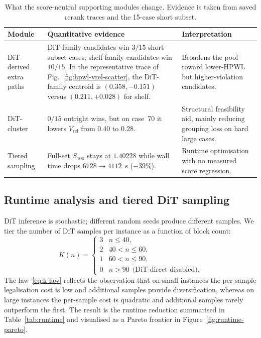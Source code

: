 \documentclass[nolineno]{ieeeaccess}
\begin{document}
\begin{table}[t]
\caption{What the score-neutral supporting modules change. Evidence is
taken from saved rerank traces and the 15-case short subset.}
\label{tab:supporting-effects}
\centering
\footnotesize
\begin{tabular}{@{}L{1.8cm}L{2.3cm}L{3.2cm}@{}}
\toprule
Module & Quantitative evidence & Interpretation\\
\midrule
DiT-derived extra paths & DiT-family candidates win $3/15$ short-subset cases; shelf-family candidates win $10/15$. In the representative trace of Fig.~\ref{fig:hpwl-vrel-scatter}, the DiT-family centroid is $(0.358,-0.151)$ versus $(0.211,+0.028)$ for shelf. & Broadens the pool toward lower-HPWL but higher-violation candidates.\\
DiT-cluster & $0/15$ outright wins, but on case~70 it lowers $V_{\text{rel}}$ from $0.40$ to $0.28$. & Structural feasibility aid, mainly reducing grouping loss on hard large cases.\\
Tiered sampling & Full-set $S_{100}$ stays at $1.40228$ while wall time drops $6728 \to 4112$~s ($-39\%$). & Runtime optimisation with no measured score regression.\\
\bottomrule
\end{tabular}
\end{table}

\subsection{Runtime analysis and tiered DiT sampling}
\label{sec:runtime-analysis}

DiT inference is stochastic; different random seeds produce different
samples. We tier the number of DiT samples per instance as a function
of block count:
\begin{equation}
K(n) = \begin{cases}
3 & n\le 40,\\
2 & 40 < n \le 60,\\
1 & 60 < n \le 90,\\
0 & n > 90 \ \ \text{(DiT-direct disabled)}.
\end{cases}
\label{eq:k-law}
\end{equation}
The law~\eqref{eq:k-law} reflects the observation that on small
instances the per-sample legalisation cost is low and additional
samples provide diversification, whereas on large instances the
per-sample cost is quadratic and additional samples rarely outperform
the first. The result is the runtime reduction summarised in
Table~\ref{tab:runtime} and visualised as a Pareto frontier in
Figure~\ref{fig:runtime-pareto}.
\end{document}
